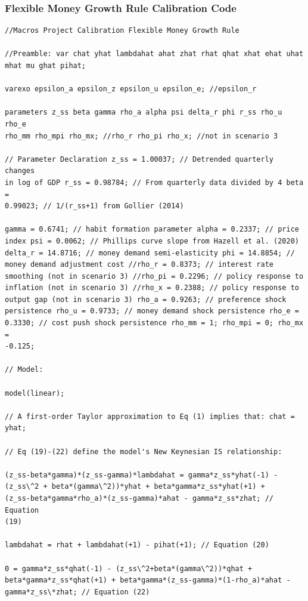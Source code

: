 \documentclass[11pt,preprint, authoryear]{elsarticle}
\numberwithin{equation}{section}
\numberwithin{figure}{section}
\numberwithin{table}{section}
\begin{document}
\hypertarget{flexible-money-growth-rule-calibration-code}{%
\subsubsection{Flexible Money Growth Rule Calibration
Code}\label{flexible-money-growth-rule-calibration-code}}

\begin{verbatim}
//Macros Project Calibration Flexible Money Growth Rule

//Preamble: var chat yhat lambdahat ahat zhat rhat qhat xhat ehat uhat
mhat mu ghat pihat;

varexo epsilon_a epsilon_z epsilon_u epsilon_e; //epsilon_r

parameters z_ss beta gamma rho_a alpha psi delta_r phi r_ss rho_u rho_e
rho_mm rho_mpi rho_mx; //rho_r rho_pi rho_x; //not in scenario 3

// Parameter Declaration z_ss = 1.00037; // Detrended quarterly changes
in log of GDP r_ss = 0.98784; // From quarterly data divided by 4 beta =
0.99023; // 1/(r_ss+1) from Gollier (2014)

gamma = 0.6741; // habit formation parameter alpha = 0.2337; // price
index psi = 0.0062; // Phillips curve slope from Hazell et al. (2020)
delta_r = 14.8716; // money demand semi-elasticity phi = 14.8854; //
money demand adjustment cost //rho_r = 0.8373; // interest rate
smoothing (not in scenario 3) //rho_pi = 0.2296; // policy response to
inflation (not in scenario 3) //rho_x = 0.2388; // policy response to
output gap (not in scenario 3) rho_a = 0.9263; // preference shock
persistence rho_u = 0.9733; // money demand shock persistence rho_e =
0.3330; // cost push shock persistence rho_mm = 1; rho_mpi = 0; rho_mx =
-0.125;

// Model:

model(linear);

// A first-order Taylor approximation to Eq (1) implies that: chat =
yhat;

// Eq (19)-(22) define the model's New Keynesian IS relationship:

(z_ss-beta*gamma)*(z_ss-gamma)*lambdahat = gamma*z_ss*yhat(-1) -
(z_ss\^2 + beta*(gamma\^2))*yhat + beta*gamma*z_ss*yhat(+1) +
(z_ss-beta*gamma*rho_a)*(z_ss-gamma)*ahat - gamma*z_ss*zhat; // Equation
(19)

lambdahat = rhat + lambdahat(+1) - pihat(+1); // Equation (20)

0 = gamma*z_ss*qhat(-1) - (z_ss\^2+beta*(gamma\^2))*qhat +
beta*gamma*z_ss*qhat(+1) + beta*gamma*(z_ss-gamma)*(1-rho_a)*ahat -
gamma*z_ss\*zhat; // Equation (22)


\end{verbatim}
\end{document}
